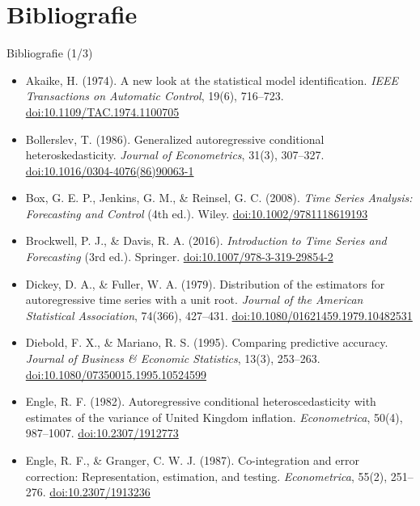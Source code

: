 \section{Bibliografie}

\begin{frame}{Bibliografie (1/3)}
\itemsize{\scriptsize}
\begin{itemize}
    \item Akaike, H. (1974). A new look at the statistical model identification. \textit{IEEE Transactions on Automatic Control}, 19(6), 716--723. \href{https://doi.org/10.1109/TAC.1974.1100705}{doi:10.1109/TAC.1974.1100705}
    \item Bollerslev, T. (1986). Generalized autoregressive conditional heteroskedasticity. \textit{Journal of Econometrics}, 31(3), 307--327. \href{https://doi.org/10.1016/0304-4076(86)90063-1}{doi:10.1016/0304-4076(86)90063-1}
    \item Box, G. E. P., Jenkins, G. M., \& Reinsel, G. C. (2008). \textit{Time Series Analysis: Forecasting and Control} (4th ed.). Wiley. \href{https://doi.org/10.1002/9781118619193}{doi:10.1002/9781118619193}
    \item Brockwell, P. J., \& Davis, R. A. (2016). \textit{Introduction to Time Series and Forecasting} (3rd ed.). Springer. \href{https://doi.org/10.1007/978-3-319-29854-2}{doi:10.1007/978-3-319-29854-2}
    \item Dickey, D. A., \& Fuller, W. A. (1979). Distribution of the estimators for autoregressive time series with a unit root. \textit{Journal of the American Statistical Association}, 74(366), 427--431. \href{https://doi.org/10.1080/01621459.1979.10482531}{doi:10.1080/01621459.1979.10482531}
    \item Diebold, F. X., \& Mariano, R. S. (1995). Comparing predictive accuracy. \textit{Journal of Business \& Economic Statistics}, 13(3), 253--263. \href{https://doi.org/10.1080/07350015.1995.10524599}{doi:10.1080/07350015.1995.10524599}
    \item Engle, R. F. (1982). Autoregressive conditional heteroscedasticity with estimates of the variance of United Kingdom inflation. \textit{Econometrica}, 50(4), 987--1007. \href{https://doi.org/10.2307/1912773}{doi:10.2307/1912773}
    \item Engle, R. F., \& Granger, C. W. J. (1987). Co-integration and error correction: Representation, estimation, and testing. \textit{Econometrica}, 55(2), 251--276. \href{https://doi.org/10.2307/1913236}{doi:10.2307/1913236}
\end{itemize}
\end{frame}

